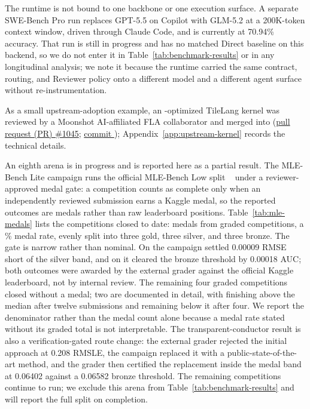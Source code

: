 The runtime is not bound to one backbone or one execution surface. A separate
SWE-Bench Pro run replaces GPT-5.5 on Copilot with GLM-5.2 at a 200K-token context
window, driven through Claude Code, and is currently at 70.94\% accuracy. That run
is still in progress and has no matched Direct baseline on this backend, so we do
not enter it in Table~\ref{tab:benchmark-results} or in any longitudinal analysis;
we note it because the runtime carried the same contract, routing, and Reviewer
policy onto a different model and a different agent surface without
re-instrumentation.

As a small upstream-adoption example, an \systemname-optimized TileLang
 kernel was reviewed by a Moonshot AI-affiliated FLA collaborator and
merged into 
(\href{https://github.com/fla-org/flash-linear-attention/pull/1045}{pull request (PR) \#1045};
\href{https://github.com/fla-org/flash-linear-attention/commit/c70f11c5530142450525549cc96d13d9f5165f69}
{commit }); Appendix~\ref{app:upstream-kernel} records the technical
details.

An eighth arena is in progress and is reported here as a partial result. The
MLE-Bench Lite campaign runs the official MLE-Bench Low split
~\citep{chan2024mlebench} under a reviewer-approved medal gate: a competition counts
as complete only when an independently reviewed submission earns a Kaggle medal, so
the reported outcomes are medals rather than raw leaderboard positions.
Table~\ref{tab:mle-medals} lists the competitions closed to date: \MLEMedals{}
medals from \MLEGraded{} graded competitions, a \MLEMedalRate\% medal rate, evenly
split into three gold, three silver, and three bronze. The gate is narrow
rather than nominal. On  the campaign settled
0.00009 RMSE short of the silver band, and on
 it cleared the bronze
threshold by 0.00018 AUC; both outcomes were awarded by the external grader
against the official Kaggle leaderboard, not by internal review. The remaining four
graded competitions closed without a medal; two are documented in detail, with
 finishing above the median after twelve submissions
and  remaining below it after four. We
report the denominator rather than the medal count alone because a medal rate stated
without its graded total is not interpretable. The
transparent-conductor result is also a verification-gated route change: the
external grader rejected the initial approach at 0.208 RMSLE, the campaign
replaced it with a public-state-of-the-art method, and the grader then certified
the replacement inside the medal band at 0.06402 against a 0.06582 bronze
threshold. The remaining competitions continue to run; we exclude this arena from
Table~\ref{tab:benchmark-results} and will report the full split on completion.

